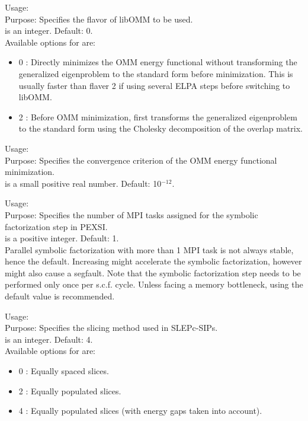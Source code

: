 {
  \noindent
  Usage:   \\[1.0ex]
  Purpose: Specifies the flavor of libOMM to be used. \\[1.0ex]
   is an integer. Default: 0. \\
}
Available options for  are:
\begin{itemize}
  \item 0 : Directly minimizes the OMM energy functional without transforming
    the generalized eigenproblem to the standard form before minimization. This
    is usually faster than flaver 2 if using several ELPA steps before switching
    to libOMM.
  \item 2 : Before OMM minimization, first transforms the generalized
    eigenproblem to the standard form using the Cholesky decomposition of the
    overlap matrix.
\end{itemize}

{
  \noindent
  Usage:   \\[1.0ex]
  Purpose: Specifies the convergence criterion of the OMM energy functional
    minimization. \\[1.0ex]
   is a small positive real number. Default: 10$^{-12}$. \\
}

{
  \noindent
  Usage:   \\[1.0ex]
  Purpose: Specifies the number of MPI tasks assigned for the symbolic
    factorization step in PEXSI. \\[1.0ex]
   is a positive integer. Default: 1. \\
}
Parallel symbolic factorization with more than 1 MPI task is not always stable,
hence the default. Increasing  might accelerate the symbolic
factorization, however might also cause a segfault. Note that the symbolic
factorization step needs to be performed only once per s.c.f. cycle. Unless
facing a memory bottleneck, using the default value is recommended.

{
  \noindent
  Usage:   \\[1.0ex]
  Purpose: Specifies the slicing method used in SLEPc-SIPs. \\[1.0ex]
   is an integer. Default: 4. \\
}
Available options for  are:
\begin{itemize}
  \item 0 : Equally spaced slices.
  \item 2 : Equally populated slices.
  \item 4 : Equally populated slices (with energy gaps taken into account).
\end{itemize}

